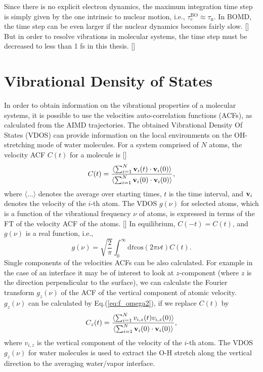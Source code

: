 Since there is no explicit electron dynamics, the maximum integration time step is simply given by the one intrinsic 
to nuclear motion, i.e., $\tau_{e}^{\text{BO}}\approx\tau_{\text{n}}$. 
In BOMD, the time step can be even larger if the nuclear dynamics becomes fairly slow. [\cite{GK93}] 
But in order to resolve vibrations in molecular systems, the time step must be decreased to less than 1 fs in this thesis. [\cite{DM00}]
%
\section{Vibrational Density of States}
In order to obtain information on the vibrational properties of a molecular systems, it is possible to use the velocities auto-correlation functions (ACFs),
as calculated from the AIMD trajectories.
The obtained Vibrational Density Of States (VDOS) can 
provide information on the local environments on the OH-stretching mode of water molecules. 
For a system comprised of $N$ atoms, the velocity ACF $C(t)$ for a molecule is [\cite{MTD,JMD,TI07}] 
\begin{equation}
C(t)=\frac{\langle\sum^{N}_{i=1}{\bf{v}}_i(t)\cdot{\bf{v}}_i(0)\rangle}{\langle\sum^{N}_{i=1}{\bf{v}}_i(0)\cdot{\bf{v}}_i(0)\rangle},
\label{eq:Ct3s}
\end{equation}
where $\langle\dots\rangle$ denotes the average over starting times, $t$ is the time interval, and ${\bf{v}}_i$ denotes 
the velocity of the $i$-th atom. The VDOS $g(\nu)$ for selected atoms, which is a function of the vibrational frequency $\nu$ 
of atoms, is expressed in terms of the FT of the velocity ACF of the atoms. [\cite{MPA86}]
In equilibrium, $C(-t)=C(t)$, and $g(\nu)$ is a real function, i.e., 
\begin{equation}
g(\nu)= \sqrt{\frac{2}{\pi}}\int^{\infty}_{0}\text{d}t \text{cos}(2\pi\nu{t})C(t).
\label{eq:f_omega2}
\end{equation}
Single components of the velocities ACFs can be also calculated. For example in the case of an interface it may be of interest to look at 
$z$-component (where $z$ is the direction perpendicular to the surface),
we can calculate the Fourier transform $g_z(\nu)$ of the ACF of the vertical component of atomic velocity. 
$g_z(\nu)$ can be calculated by Eq.\thinspace(\ref{eq:f_omega2}), if we replace $C(t)$ by 
\begin{equation}
C_z(t)=\frac{\langle\sum^{N}_{i=1}{v_{i,z}(t){v_{i,z}(0)\rangle}}}{\langle\sum^{N}_{i=1}{\bf{v}}_i(0)\cdot{\bf{v}}_i(0)\rangle},
\label{eq:ACN}
\end{equation}
where $v_{i,z}$ is the vertical component of the velocity of the $i$-th atom.
The VDOS $g_z(\nu)$ for water molecules is used to extract the O-H stretch along the vertical direction to the averaging water/vapor interface. 

